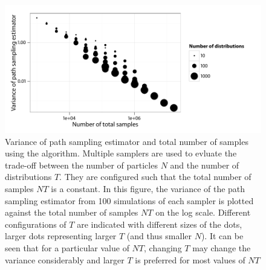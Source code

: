 \begin{figure}[t]
  \UseAltLinespread
  \includegraphics[width=\linewidth]{fig_src/Particle_Iter_Var}
  \caption[Variance of path sampling estimator and total number of samples
  using \protect\smc algorithm]
  {Variance of path sampling estimator and total number of samples using the
    \smc[2] algorithm. Multiple samplers are used to evluate the trade-off
    between the number of particles $N$ and the number of distributions $T$.
    They are configured such that the total number of samples $NT$ is a
    constant. In this figure, the variance of the path sampling estimator from
    100 simulations of each sampler is plotted against the total number of
    samples $NT$ on the log scale. Different configurations of $T$ are
    indicated with different sizes of the dots, larger dots representing
    larger $T$ (and thus smaller $N$). It can be seen that for a particular
    value of $NT$, changing $T$ may change the variance considerably and
    larger $T$ is preferred for most values of $NT$}
  \label{fig:particle iter num}
\end{figure}

